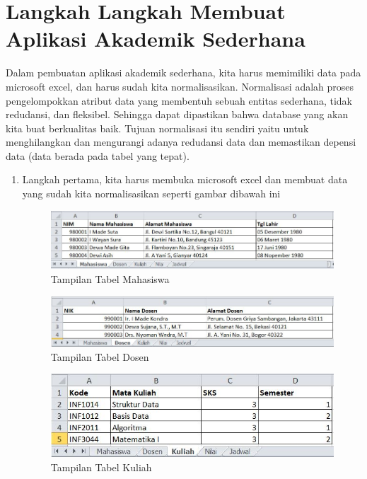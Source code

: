 \section{Langkah Langkah Membuat Aplikasi Akademik Sederhana}

Dalam pembuatan aplikasi akademik sederhana, kita harus memimiliki data pada microsoft excel, dan harus sudah kita normalisasikan. Normalisasi adalah proses pengelompokkan atribut data yang membentuh sebuah entitas sederhana, tidak redudansi, dan fleksibel. Sehingga dapat dipastikan bahwa database yang akan kita buat berkualitas baik. Tujuan normalisasi itu sendiri yaitu untuk menghilangkan dan mengurangi adanya redudansi data dan memastikan depensi data (data berada pada tabel yang tepat). 
\begin{enumerate}
    \item Langkah pertama, kita harus membuka microsoft excel dan membuat data yang sudah kita normalisasikan seperti gambar dibawah ini
    \begin{figure}[!htbp]
    \begin{center}
    \includegraphics[scale=0.9]{section/ica51.JPG}
    \caption{Tampilan Tabel Mahasiswa}
    \end{center}   
    \end{figure} 
    
    \begin{figure}[!htbp]
    \begin{center}
    \includegraphics[scale=0.9]{section/ica52.JPG}
    \caption{Tampilan Tabel Dosen}
    \end{center}   
    \end{figure} 
    
    \begin{figure}[!htbp]
    \begin{center}
    \includegraphics[scale=0.9]{section/ica53.JPG}
    \caption{Tampilan Tabel Kuliah}
    \end{center}   
    \end{figure} 


\end{enumerate}
